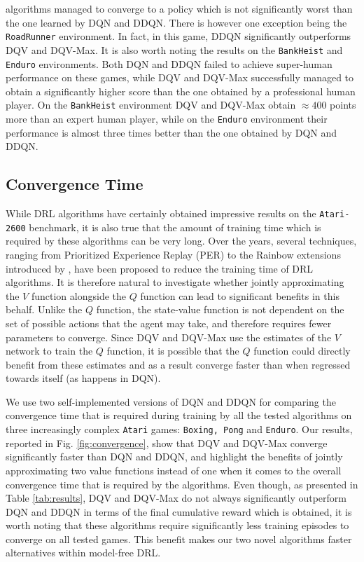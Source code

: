 algorithms managed to converge to a policy which is not significantly worst than the one learned by DQN and DDQN.
There is however one exception being the \texttt{RoadRunner} environment. In fact, in this game, DDQN significantly outperforms DQV and DQV-Max. It is also worth noting the results on the \texttt{BankHeist} and \texttt{Enduro} environments. Both DQN and DDQN failed to achieve super-human performance on these games, while DQV and DQV-Max successfully managed to obtain a significantly higher score than the one obtained by a professional human player. On the \texttt{BankHeist} environment DQV and DQV-Max obtain $\approx 400$ points more than an expert human player, while on the \texttt{Enduro} environment their performance is almost three times better than the one obtained by DQN and DDQN.




\subsection{Convergence Time}
\label{sec:convergence_time}

While DRL algorithms have certainly obtained impressive results on the \texttt{Atari-2600} benchmark, it is also true that the amount of training time which is required by these algorithms can be very long. Over the years, several techniques, ranging from Prioritized Experience Replay (PER) \cite{wang2016dueling} to the Rainbow extensions introduced by \citet{hessel2018rainbow}, have been proposed to reduce the training time of DRL algorithms. It is therefore natural to investigate whether jointly approximating the $V$ function alongside the $Q$ function can lead to significant benefits in this behalf. Unlike the $Q$ function, the state-value function is not dependent on the set of possible actions that the agent may take, and therefore requires fewer parameters to converge. Since DQV and DQV-Max use the estimates of the $V$ network to train the $Q$ function, it is possible that the $Q$ function could directly benefit from these estimates and as a result converge faster than when regressed towards itself (as happens in DQN).

We use two self-implemented versions of DQN and DDQN for comparing the convergence time that is required during training by all the tested algorithms on three increasingly complex \texttt{Atari} games: \texttt{Boxing, Pong} and \texttt{Enduro}. Our results, reported in Fig. \ref{fig:convergence}, show that DQV and DQV-Max converge significantly faster than DQN and DDQN, and highlight the benefits of jointly approximating two value functions instead of one when it comes to the overall convergence time that is required by the algorithms. Even though, as presented in Table \ref{tab:results}, DQV and DQV-Max do not always significantly outperform DQN and DDQN in terms of the final cumulative reward which is obtained, it is worth noting that these algorithms require significantly less training episodes to converge on all tested games. This benefit makes our two novel algorithms faster alternatives within model-free DRL.

